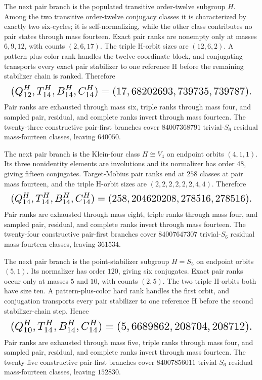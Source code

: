 \documentclass{article}
\newcommand{\fitmath}[1]{\resizebox{0.99\linewidth}{!}{$\displaystyle #1$}}
\begin{document}
The next pair branch is the populated transitive order-twelve subgroup $H$.
Among the two transitive order-twelve conjugacy classes it is characterized by
exactly two six-cycles; it is self-normalizing,
while the other class contributes
no pair states through mass fourteen. Exact pair ranks are nonempty only at
masses $6,9,12$, with counts $(2,6,17)$. The triple H-orbit sizes are
$(12,6,2)$. A pattern-plus-color rank handles the twelve-coordinate block, and
conjugating transports every exact pair stabilizer to one reference H before
the remaining stabilizer chain is ranked. Therefore
\begin{equation}
  \fitmath{%
    (Q^H_{12},T^H_{14},B^H_{14},C^H_{14})
      =(17,68202693,739735,739787).
  }
  \label{eq:optimization-crazy-sextuple-s6-pair-transitive-order12-ranking}
\end{equation}
Pair ranks are exhausted through mass six, triple ranks through mass four, and
sampled pair, residual, and complete ranks invert through mass fourteen. The
twenty-three constructive pair-first branches cover $84007368791$ trivial-$S_6$
residual mass-fourteen classes, leaving $640050$.

The next pair branch is the Klein-four class $H\cong V_4$ on endpoint orbits
$(4,1,1)$. Its three nonidentity elements are involutions and its normalizer has
order $48$, giving fifteen conjugates. Target-Mobius pair ranks end at $258$
classes at pair mass fourteen, and the triple H-orbit sizes are
$(2,2,2,2,2,2,4,4)$. Therefore
\begin{equation}
  \fitmath{%
    (Q^H_{14},T^H_{14},B^H_{14},C^H_{14})
      =(258,204620208,278516,278516).
  }
  \label{eq:optimization-crazy-sextuple-s6-pair-v4-411-ranking}
\end{equation}
Pair ranks are exhausted through mass eight, triple ranks through mass four,
and sampled pair, residual, and complete ranks invert through mass fourteen.
The twenty-four constructive pair-first branches cover $84007647307$
trivial-$S_6$ residual mass-fourteen classes, leaving $361534$.

The next pair branch is the point-stabilizer subgroup $H=S_5$ on endpoint
orbits $(5,1)$. Its normalizer has order $120$, giving six conjugates. Exact
pair ranks occur only at masses $5$ and $10$, with counts $(2,5)$. The two
triple H-orbits both have size ten. A pattern-plus-color hard rank handles the
first orbit, and conjugation transports every pair stabilizer to one reference
H before the second stabilizer-chain step. Hence
\begin{equation}
  \fitmath{%
    (Q^H_{10},T^H_{14},B^H_{14},C^H_{14})
      =(5,6689862,208704,208712).
  }
  \label{eq:optimization-crazy-sextuple-s6-pair-point-s5-ranking}
\end{equation}
Pair ranks are exhausted through mass five, triple ranks through mass four, and
sampled pair, residual, and complete ranks invert through mass fourteen. The
twenty-five constructive pair-first branches cover $84007856011$
trivial-$S_6$ residual mass-fourteen classes, leaving $152830$.
\end{document}
